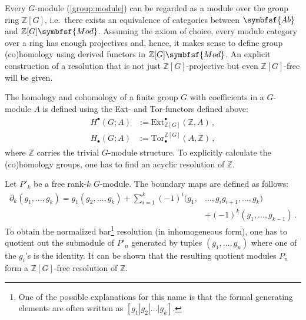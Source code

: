    Every $G$-module (\cref{group:module}) can be regarded as a module over the group ring $\mathbb{Z}[G]$, i.e.~there exists an equivalence of categories between $\symbfsf{Ab}$ and $\mathbb{Z}[G]\symbfsf{Mod}$. Assuming the axiom of choice, every module category over a ring has enough projectives and, hence, it makes sense to define group (co)homology using derived functors in $\mathbb{Z}[G]\symbfsf{Mod}$. An explicit construction of a resolution that is not just $\mathbb{Z}[G]$-projective but even $\mathbb{Z}[G]$-free will be given.

	The homology and cohomology of a finite group $G$ with coefficients in a $G$-module $A$ is defined using the Ext- and Tor-functors defined above:
	\begin{gather}
		\begin{aligned}
			H^\bullet(G;A) &:= \mathrm{Ext}_{\mathbb{Z}[G]}^\bullet(\mathbb{Z},A)\,,\\
			H_\bullet(G;A) &:= \mathrm{Tor}_\bullet^{\mathbb{Z}[G]}(A,\mathbb{Z})\,,
		\end{aligned}
	\end{gather}
	where $\mathbb{Z}$ carries the trivial $G$-module structure. To explicitly calculate the (co)homology groups, one has to find an acyclic resolution of $\mathbb{Z}$.
	\begin{construct}
		Let $P'_k$ be a free rank-$k$ $G$-module. The boundary maps are defined as follows:
		\begin{align}
			\label{homalg:group_boundary}
			\partial_k(g_1,\ldots,g_k) = g_1(g_2,\ldots,g_k) + \sum_{i=1}^k (-1)^i(g_1,&\ldots,g_ig_{i+1},\ldots,g_k)\\
             &+ (-1)^k(g_1,\ldots,g_{k-1})\,.\nonumber
		\end{align}
		To obtain the normalized bar\footnote{One of the possible explanations for this name is that the formal generating elements are often written as $[g_1|g_2|\ldots|g_k]$.} resolution (in inhomogeneous form), one has to quotient out the submodule of $P'_n$ generated by tuples $(g_1,\ldots,g_n)$ where one of the $g_i$'s is the identity. It can be shown that the resulting quotient modules $P_n$ form a $\mathbb{Z}[G]$-free resolution of $\mathbb{Z}$.
	\end{construct}

